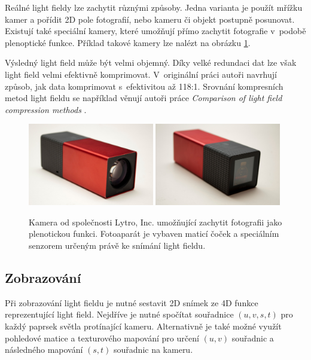 Reálné light fieldy lze zachytit různými způsoby. Jedna varianta je použít mřížku kamer a pořídit 2D pole fotografií, nebo kameru či objekt postupně posunovat. Existují také speciální kamery, které umožňují přímo zachytit fotografie v~podobě plenoptické funkce. Příklad takové kamery lze nalézt na obrázku \ref{fig:lytro}.


Výsledný light field může být velmi objemný. Díky velké redundaci dat lze však light field velmi efektivně komprimovat. V~originální práci \cite{levoy1996light} autoři navrhují způsob, jak data komprimovat s~efektivitou až 118:1. Srovnání kompresních metod light fieldu se například věnují autoři práce \emph{Comparison of light field compression methods} \cite{barina2021comparison}.

\begin{figure}[H]
	\centering
	\includegraphics[width=0.49\textwidth]{obrazky-figures/lytro1-min.jpg}
	\includegraphics[width=0.49\textwidth]{obrazky-figures/lytro2-min.jpg}
	\caption[Caption for LOF]{Kamera od společnosti Lytro, Inc. umožňující zachytit fotografii jako plenotickou  funkci. Fotoaparát je vybaven maticí čoček a speciálním senzorem určeným právě ke snímání light fieldu\protect\footnotemark. }
	\label{fig:lytro}
\end{figure}

\subsection{Zobrazování}
\label{sec:lightfield_zobrazeni}
Při zobrazování light fieldu je nutné sestavit 2D snímek ze 4D funkce reprezentující light field. Nejdříve je nutné spočítat souřadnice \((u,v,s,t)\) pro každý paprsek světla protínající kameru. Alternativně je také možné využít pohledové matice a texturového mapování pro určení \((u,v)\) souřadnic a následného mapování \((s,t)\) souřadnic na kameru. 

